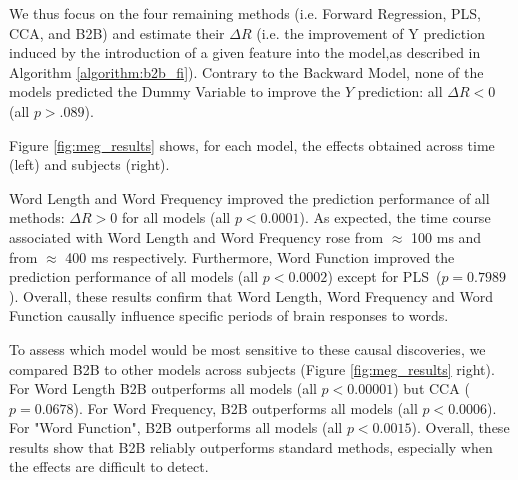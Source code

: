 We thus focus on the four remaining methods (i.e. Forward Regression, PLS, CCA,
and B2B) and estimate their $\Delta R$ (i.e. the improvement of Y prediction
induced by the introduction of a given feature into the model,as described in
Algorithm \ref{algorithm:b2b_fi}). Contrary to the Backward Model, none of the
models predicted the Dummy Variable to improve the $Y$ prediction: all $\Delta R
< 0$ (all $p > .089$).

Figure \ref{fig:meg_results} shows, for each model, the effects obtained across
time (left) and subjects (right).

Word Length and Word Frequency improved the prediction performance of all
methods: $\Delta R>0$ for all models (all $p<0.0001$). As expected, the time
course associated with Word Length and Word Frequency rose from $\approx$ 100 ms
and from $\approx$ 400 ms respectively. Furthermore, Word Function improved the
prediction performance of all models (all $p < 0.0002$) except for
PLS~($p=0.7989$). Overall, these results confirm that Word Length, Word
Frequency and Word Function causally influence specific periods of brain
responses to words.

To assess which model would be most sensitive to these causal discoveries, we
compared B2B to other models across subjects (Figure \ref{fig:meg_results}
right). For Word Length B2B outperforms all models (all $p < 0.00001$) but CCA
($p=0.0678$). For Word Frequency, B2B outperforms all models (all $p < 0.0006$).
For "Word Function", B2B outperforms all models (all $p < 0.0015$). Overall,
these results show that B2B reliably outperforms standard methods, especially
when the effects are difficult to detect.
